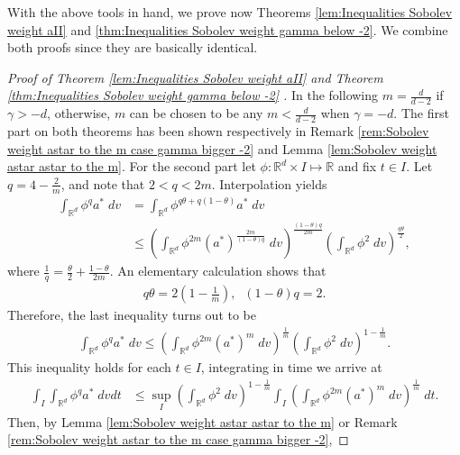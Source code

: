 \documentclass[12pt,american]{amsart}
\numberwithin{equation}{section}
\theoremstyle{plain}
\theoremstyle{definition}                  %
\def\astar{{a^*}}
\begin{document}
 
 
  
 
 With the above tools in hand, we prove now Theorems \ref{lem:Inequalities Sobolev weight aII} and \ref{thm:Inequalities Sobolev weight gamma below -2}. We combine both proofs since they are basically identical. 

  \begin{proof}[Proof of Theorem \ref{lem:Inequalities Sobolev weight aII} and Theorem \ref{thm:Inequalities Sobolev weight gamma below -2} ] 
 In the following $m = \frac{d}{d-2}$ if $\gamma>-d$, otherwise, $m$ can be chosen to be any $m<\frac{d}{d-2}$ when $\gamma=-d$. The first part on both theorems has been shown respectively in Remark \ref{rem:Sobolev weight astar to the m case gamma bigger -2} and Lemma \ref{lem:Sobolev weight astar astar to the m}. For the second part  let $\phi: \mathbb{R}^d \times I \mapsto \mathbb{R}$ and fix $t\in I$. Let $q = 4-\frac{2}{m}$, and note that $2<q<2m$. Interpolation yields 
  \begin{align*}
    \int_{\mathbb{R}^d}\phi^q \astar \;dv & =  \int_{\mathbb{R}^d} \phi^{q\theta + q(1-\theta)} \astar \;dv \\
      & \leq \left ( \int_{\mathbb{R}^d} \phi^{2m} (\astar)^{\frac{2m}{(1-\theta)q}} \;dv \right )^{\frac{(1-\theta)q}{2m}} \left (\int_{\mathbb{R}^d} \phi^{2}\;dv \right )^{\frac{q \theta}{2}},
  \end{align*}
  where $\frac{1}{q} = \frac{\theta}{2}+\frac{1-\theta}{2m}$. An elementary calculation shows that
  \begin{align*}
    q\theta = 2\left (1-\frac{1}{m} \right ),\;\;(1-\theta)q= 2. 
  \end{align*}	  
  Therefore, the last inequality turns out to be
  \begin{align*}
    \int_{\mathbb{R}^d} \phi^q \astar \;dv \leq \left (  \int_{\mathbb{R}^d} \phi^{2m} (\astar)^m\;dv\right )^{\frac{1}{m}} \left (\int_{\mathbb{R}^d} \phi^2\;dv \right )^{1-\frac{1}{m}}.
  \end{align*}
 This inequality holds for each $t\in I$, integrating in time we arrive at
  \begin{align*}
    \int_I\int_{\mathbb{R}^d}\phi^q \astar \;dvdt & \leq \sup \limits_{I} \left(\int_{\mathbb{R}^d} \phi^{2}\;dv \right )^{1-\frac{1}{m}} \int_{I}\left (  \int_{\mathbb{R}^d} \phi^{2m} (\astar)^{m} \;dv \right )^{\frac{1}{m}}\;dt.
   \end{align*}
   Then, by Lemma \ref{lem:Sobolev weight astar astar to the m} or Remark \ref{rem:Sobolev weight astar to the m case gamma bigger -2},

\end{proof}
\end{document}
